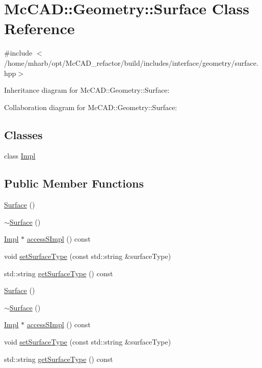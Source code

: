 \hypertarget{classMcCAD_1_1Geometry_1_1Surface}{}\section{Mc\+C\+AD\+:\+:Geometry\+:\+:Surface Class Reference}
\label{classMcCAD_1_1Geometry_1_1Surface}


{\ttfamily \#include $<$/home/mharb/opt/\+Mc\+C\+A\+D\+\_\+refactor/build/includes/interface/geometry/surface.\+hpp$>$}



Inheritance diagram for Mc\+C\+AD\+:\+:Geometry\+:\+:Surface\+:


Collaboration diagram for Mc\+C\+AD\+:\+:Geometry\+:\+:Surface\+:
\subsection*{Classes}
\begin{DoxyCompactItemize}
\item 
class \hyperlink{classMcCAD_1_1Geometry_1_1Surface_1_1Impl}{Impl}
\end{DoxyCompactItemize}
\subsection*{Public Member Functions}
\begin{DoxyCompactItemize}
\item 
\hyperlink{classMcCAD_1_1Geometry_1_1Surface_af8c5757177e043d499b55b9e1d065a66}{Surface} ()
\item 
\hyperlink{classMcCAD_1_1Geometry_1_1Surface_a0519721d6a29d0d142133c91b7fceeb2}{$\sim$\+Surface} ()
\item 
\hyperlink{classMcCAD_1_1Geometry_1_1Surface_1_1Impl}{Impl} $\ast$ \hyperlink{classMcCAD_1_1Geometry_1_1Surface_a989de1f9ebe3de043412014ed25e52eb}{access\+S\+Impl} () const
\item 
void \hyperlink{classMcCAD_1_1Geometry_1_1Surface_a976893834481e58569db0d35db2ba969}{set\+Surface\+Type} (const std\+::string \&surface\+Type)
\item 
std\+::string \hyperlink{classMcCAD_1_1Geometry_1_1Surface_ac81308cae2d3fd458dfa311adea23688}{get\+Surface\+Type} () const
\item 
\hyperlink{classMcCAD_1_1Geometry_1_1Surface_af8c5757177e043d499b55b9e1d065a66}{Surface} ()
\item 
\hyperlink{classMcCAD_1_1Geometry_1_1Surface_a0519721d6a29d0d142133c91b7fceeb2}{$\sim$\+Surface} ()
\item 
\hyperlink{classMcCAD_1_1Geometry_1_1Surface_1_1Impl}{Impl} $\ast$ \hyperlink{classMcCAD_1_1Geometry_1_1Surface_adafee834670eb8c97025e24ffd6df844}{access\+S\+Impl} () const
\item 
void \hyperlink{classMcCAD_1_1Geometry_1_1Surface_a976893834481e58569db0d35db2ba969}{set\+Surface\+Type} (const std\+::string \&surface\+Type)
\item 
std\+::string \hyperlink{classMcCAD_1_1Geometry_1_1Surface_ac81308cae2d3fd458dfa311adea23688}{get\+Surface\+Type} () const
\end{DoxyCompactItemize}
